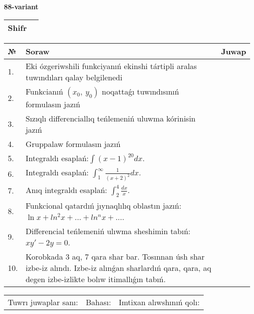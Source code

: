 \documentclass{article}
\begin{document}
  \egroup
  
  \newpage
  
  
  \textbf{88-variant}\\
  
  \bgroup
  \def\arraystretch{1.6} %
  
  \begin{tabular}{|m{5.7cm}|m{9.5cm}|}
  \hline
  Shifr & \\
  \hline
  \end{tabular}
  
  \vspace{1cm}
  
  \begin{tabular}{|m{0.7cm}|m{10cm}|m{4cm}|}
  \hline
  № & Soraw & Juwap \\
  \hline
  1. & Eki ózgeriwshili funkciyanıń ekinshi tártipli aralas tuwındıları qalay belgilenedi &  \\
  \hline
  2. & Funkcianıń \((x_{0},\ y_{0})\) noqattaǵı tuwındısınıń formulasın jazıń &  \\
  \hline
  3. & Sızıqlı differenciallıq teńlemeniń uluwma kórinisin jazıń &  \\
  \hline
  4. & Gruppalaw formulasın jazıń &  \\
  \hline
  5. & Integraldı esaplań:\(\int{(x - 1)^{20}}dx\). &  \\
  \hline
  6. & Integraldı esaplań: \(\int_{1}^{\infty}{\frac{1}{(x + 2)^2 }dx}\). &  \\
  \hline
  7. & Anıq integraldı esaplań: \(\int_{2}^{4}\frac{dx}{x}\). &  \\
  \hline
  8. & Funkcional qatardıń jıynaqlılıq oblastın jazıń: \(\ln x + ln^2 x + ... + ln^{n}x + ...\). &  \\
  \hline
  9. & Differencial teńlemeniń ulıwma sheshimin tabıń: \(xy' - 2y = 0\). &  \\
  \hline
  10. & Korobkada 3 aq, 7 qara shar bar. Tosınnan úsh shar izbe-iz alındı. Izbe-iz alınǵan sharlardıń qara, qara, aq degen izbe-izlikte bolıw itimallıǵın tabıń. &  \\
  \hline
  \end{tabular}
  
  \vspace{1cm}
  
  \begin{tabular}{lll}
  Tuwrı juwaplar sanı: \underline{\hspace{1.5cm}} & 
  Bahası: \underline{\hspace{1.5cm}} & 
  Imtixan alıwshınıń qolı: \underline{\hspace{2cm}} \\
  \end{tabular}
  
\end{document}
